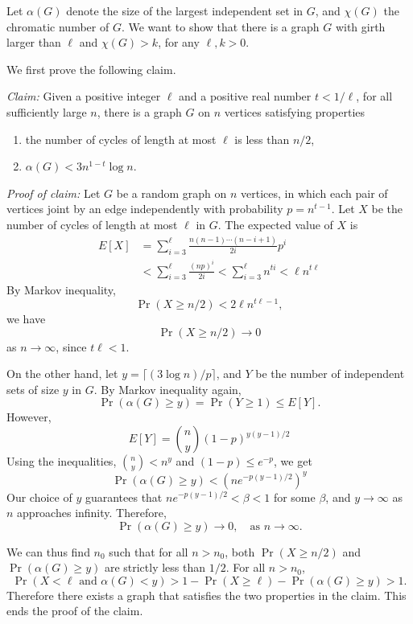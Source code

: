 \documentclass[12pt]{article}
\begin{document}


Let $\alpha(G)$ denote the size of the largest independent set in
$G$, and $\chi(G)$ the chromatic number of $G$. We want to show
that there is a graph $G$ with girth larger than $\ell$ and
$\chi(G)>k$, for any $\ell, k > 0$.

\bigskip

We first prove the following claim.

{\it Claim:} Given a positive integer $\ell$ and a positive real
number $t<1/\ell$, for all sufficiently large $n$, there is a
graph $G$ on $n$ vertices satisfying properties

\begin{enumerate}
\item  the number of cycles of length at most $\ell$ is less than
$n/2$,

\item $\alpha(G) < 3n^{1-t}\log n$.
\end{enumerate}

{\it Proof of claim:} Let $G$ be a random graph on $n$ vertices,
in which each pair of vertices joint by an edge independently with
probability $p=n^{t-1}$. Let $X$ be the number of cycles of length
at most $\ell$ in $G$. The expected value of $X$ is
\begin{align*}
  E[X] &= \sum_{i=3}^\ell \frac{n(n-1)\cdots(n-i+1)}{2i}p^i \\
  &< \sum_{i=3}^\ell \frac{(np)^i}{2i} < \sum_{i=3}^\ell n^{ti} < \ell n^{t\ell}
\end{align*}
By Markov inequality,
\[
  \Pr(X \geq n/2) < 2\ell n^{t\ell-1},
\]
we have
\[ \Pr(X \geq n/2) \rightarrow 0
\]
as $n\rightarrow \infty$, since $t\ell < 1$.

On the other hand, let $y=\lceil (3\log n)/ p \rceil$, and $Y$ be
the number of independent sets of size $y$ in $G$. By Markov
inequality again,
\[
  \Pr(\alpha(G)\geq y) = \Pr(Y\geq 1) \leq E[Y].
\]
However,
\[
 E[Y] = {n \choose y} (1-p)^{y(y-1)/2}
\]
Using the inequalities, ${n \choose y} < n^y$ and $(1-p)\leq
e^{-p}$, we get
\[
 \Pr(\alpha(G)\geq y) < (n e^{-p(y-1)/2})^y
\]
Our choice of $y$ guarantees that $n e^{-p(y-1)/2} < \beta < 1 $
for some $\beta$, and $y\rightarrow \infty$ as $n$ approaches
infinity. Therefore,
\[
 \Pr(\alpha(G)\geq y) \rightarrow 0, \quad \text{as
 $n\rightarrow\infty$}.
\]



We can thus find $n_0$ such that for all $n>n_0$, both  $\Pr(X
\geq n/2)$ and $\Pr(\alpha(G)\geq y)$ are strictly less than
$1/2$. For all $n>n_0$,
\[
 \Pr(X<\ell \text{ and } \alpha(G)<y) > 1-\Pr(X\geq\ell)-\Pr(
 \alpha(G)\geq y)>1.
\]
Therefore there exists a graph that satisfies the two properties
in the claim. This ends the proof of the claim.
\end{document}
